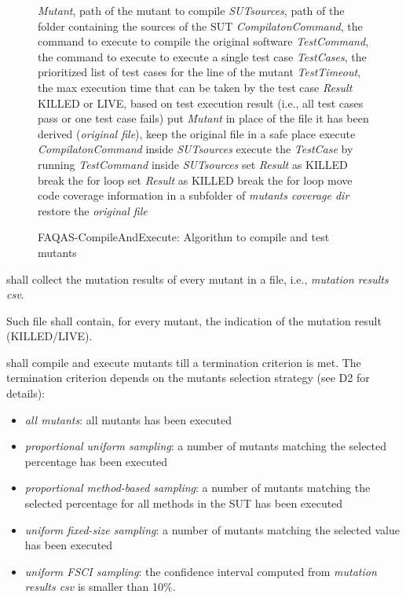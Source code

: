 \begin{figure}[h]
\begin{algorithmic}[1]
\scriptsize
\Require \emph{Mutant}, path of the mutant to compile
\Require \emph{SUTsources}, path of the folder containing the sources of the SUT
\Require \emph{CompilatonCommand}, the command to execute to compile the original software
\Require \emph{TestCommand}, the command to execute to execute a single test case
\Require \emph{TestCases}, the prioritized list of test cases for the line of the mutant
\Require \emph{TestTimeout}, the max execution time that can be taken by the test case
\Ensure \emph{Result} KILLED or LIVE, based on test execution result (i.e., all test cases pass or one test case fails)
\State put \emph{Mutant} in place of the file it has been derived (\emph{original file}), keep the original file in a safe place
\State execute  \emph{CompilatonCommand} inside \emph{SUTsources}
\State execute the \emph{TestCase} by running \emph{TestCommand} inside \emph{SUTsources}
\State set \emph{Result} as KILLED
\State break the for loop
\EndIf
{}
\State set \emph{Result} as KILLED
\State break the for loop
\EndIf
\EndFor
\State move code coverage information in a subfolder of \emph{mutants coverage dir}
\State restore the \emph{original file}
\end{algorithmic}
\caption{FAQAS-CompileAndExecute: Algorithm to compile and test mutants}
\label{alg:compileAndExecute}
\end{figure}

\RQ{} \FAQAS shall collect the mutation results of every mutant in a file, i.e., \emph{mutation results csv}.

\remark Such file shall contain, for every mutant, the indication of the mutation result (KILLED/LIVE).

\RQ{} \FAQAS shall compile and execute mutants till a termination criterion is met. The termination criterion depends on the mutants selection strategy (see D2 for details):
	\begin{itemize}
		\item \emph{all mutants}: all mutants has been executed
		\item \emph{proportional uniform sampling}: a number of mutants matching the selected percentage has been executed
		\item \emph{proportional method-based sampling}: a number of mutants matching the selected percentage for all methods in the SUT has been executed
		\item \emph{uniform fixed-size sampling}: a number of mutants matching the selected value has been executed
		\item \emph{uniform FSCI sampling}: the confidence interval computed from \emph{mutation results csv} is smaller than 10\%.
	\end{itemize}

